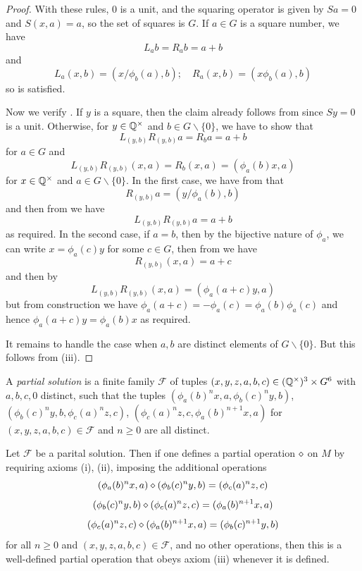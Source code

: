 \begin{proof}
  With these rules, $0$ is a unit, and the squaring operator is given by $Sa = 0$ and $S(x,a) = a$, so the set of squares is $G$.  If $a \in G$ is a square number, we have
  $$ L_a b = R_a b = a+b$$
  and
  $$ L_a (x,b) = (x/\phi_b(a), b); \quad R_a (x,b) = (x \phi_b(a), b)$$
  so  is satisfied.

Now we verify .
If $y$ is a square, then the claim already follows from  since $Sy=0$ is a unit.  Otherwise, for $y \in \mathbb{Q}^\times$ and $b \in G \backslash \{0\}$, we have to show that
$$ L_{(y,b)} R_{(y,b)} a = R_b a = a+b$$
for $a \in G$ and
$$ L_{(y,b)} R_{(y,b)} (x,a) = R_b (x,a) = (\phi_a(b) x, a) $$
for $x \in \mathbb{Q}^\times$ and $a \in G \backslash \{0\}$.  In the first case, we have from  that
$$ R_{(y,b)} a = (y/\phi_a(b), b)$$
and then from  we have
$$L_{(y,b)} R_{(y,b)} a = a+b$$
as required.  In the second case, if $a=b$, then by the bijective nature of $\phi_a$, we can write $x = \phi_a(c) y$ for some $c \in G$, then from  we have
$$ R_{(y,b)} (x,a) = a+c$$
and then by 
$$ L_{(y,b)} R_{(y,b)} (x,a) = (\phi_a(a+c) y, a)$$
but from construction we have $\phi_a(a+c)=-\phi_a(c) = \phi_a(b)\phi_a(c)$ and hence $\phi_a(a+c) y = \phi_a(b) x$ as required.

It remains to handle the case when $a,b$ are distinct elements of $G \backslash \{0\}$.  But this follows from (iii).
\end{proof}

\begin{definition}\label{partial-1323} A \emph{partial solution} is a finite family ${\mathcal F}$ of tuples $(x,y,z,a,b,c) \in (\mathbb{Q}^\times)^3 \times G^6$ with $a,b,c,0$ distinct, such that the tuples
$(\phi_a(b)^n x,a, \phi_b(c)^n y,b)$, $(\phi_b(c)^n y,b,\phi_c(a)^n z,c)$, $(\phi_c(a)^n z,c,\phi_a(b)^{n+1} x, a)$ for $(x,y,z,a,b,c) \in {\mathcal F}$ and $n \geq 0$ are all distinct.
\end{definition}

\begin{lemma}[Soundness]\label{partial-1323-sound}  Let ${\mathcal F}$ be a parital solution.  Then if one defines a partial operation $\diamond$ on $M$ by requiring axioms (i), (ii), imposing the additional operations
$$ (\phi_a(b)^n x,a) \diamond (\phi_b(c)^n y,b) = (\phi_c(a)^n z,c)$$
$$ (\phi_b(c)^n y,b) \diamond (\phi_c(a)^n z,c) = (\phi_a(b)^{n+1} x, a)$$
$$ (\phi_c(a)^n z,c) \diamond (\phi_a(b)^{n+1} x, a) = (\phi_b(c)^{n+1} y,b)$$
for all $n \geq 0$ and $(x,y,z,a,b,c) \in {\mathcal F}$, and no other operations, then this is a well-defined partial operation that obeys axiom (iii) whenever it is defined.
\end{lemma}

